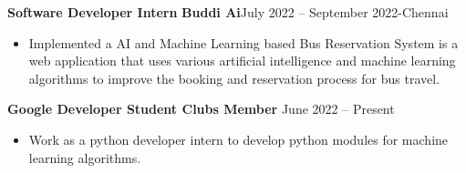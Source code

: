 
 \textbf{Software Developer Intern} \textbf{Buddi Ai}{July 2022 -- September 2022}{-Chennai}
\begin{itemize}
\item Implemented a AI and Machine Learning based Bus Reservation System is a web application that uses various artificial intelligence and machine learning algorithms to improve the booking and reservation process for bus travel.
\end{itemize}
\divider
\medskip
\textbf{Google Developer Student Clubs Member} {June 2022 -- Present }{}
\begin{itemize}
\item Work as a python developer intern to develop python modules for machine learning algorithms. 
\end{itemize}



